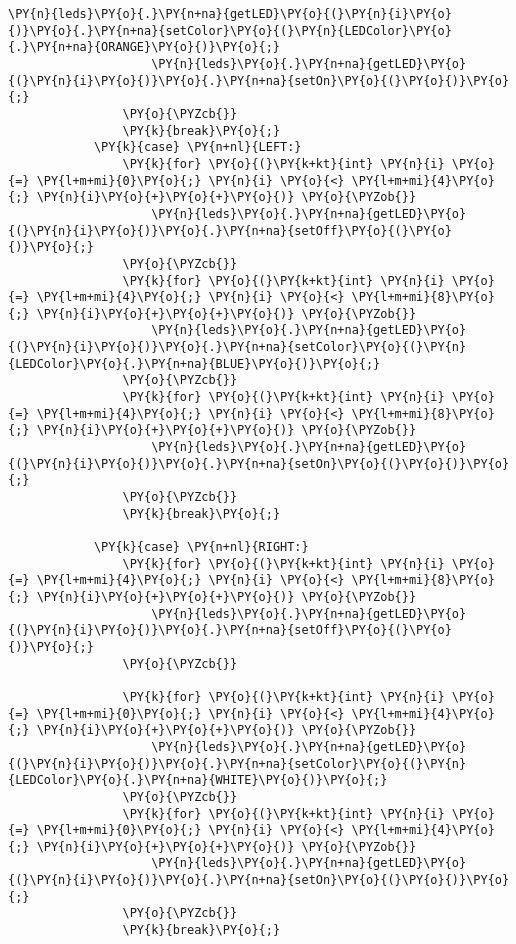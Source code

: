 \begin{Verbatim}[commandchars=\\\{\}]
                    \PY{n}{leds}\PY{o}{.}\PY{n+na}{getLED}\PY{o}{(}\PY{n}{i}\PY{o}{)}\PY{o}{.}\PY{n+na}{setColor}\PY{o}{(}\PY{n}{LEDColor}\PY{o}{.}\PY{n+na}{ORANGE}\PY{o}{)}\PY{o}{;}
                    \PY{n}{leds}\PY{o}{.}\PY{n+na}{getLED}\PY{o}{(}\PY{n}{i}\PY{o}{)}\PY{o}{.}\PY{n+na}{setOn}\PY{o}{(}\PY{o}{)}\PY{o}{;}
                \PY{o}{\PYZcb{}}
                \PY{k}{break}\PY{o}{;}
            \PY{k}{case} \PY{n+nl}{LEFT:}
                \PY{k}{for} \PY{o}{(}\PY{k+kt}{int} \PY{n}{i} \PY{o}{=} \PY{l+m+mi}{0}\PY{o}{;} \PY{n}{i} \PY{o}{<} \PY{l+m+mi}{4}\PY{o}{;} \PY{n}{i}\PY{o}{+}\PY{o}{+}\PY{o}{)} \PY{o}{\PYZob{}}
                    \PY{n}{leds}\PY{o}{.}\PY{n+na}{getLED}\PY{o}{(}\PY{n}{i}\PY{o}{)}\PY{o}{.}\PY{n+na}{setOff}\PY{o}{(}\PY{o}{)}\PY{o}{;}
                \PY{o}{\PYZcb{}}
                \PY{k}{for} \PY{o}{(}\PY{k+kt}{int} \PY{n}{i} \PY{o}{=} \PY{l+m+mi}{4}\PY{o}{;} \PY{n}{i} \PY{o}{<} \PY{l+m+mi}{8}\PY{o}{;} \PY{n}{i}\PY{o}{+}\PY{o}{+}\PY{o}{)} \PY{o}{\PYZob{}}
                    \PY{n}{leds}\PY{o}{.}\PY{n+na}{getLED}\PY{o}{(}\PY{n}{i}\PY{o}{)}\PY{o}{.}\PY{n+na}{setColor}\PY{o}{(}\PY{n}{LEDColor}\PY{o}{.}\PY{n+na}{BLUE}\PY{o}{)}\PY{o}{;}
                \PY{o}{\PYZcb{}}
                \PY{k}{for} \PY{o}{(}\PY{k+kt}{int} \PY{n}{i} \PY{o}{=} \PY{l+m+mi}{4}\PY{o}{;} \PY{n}{i} \PY{o}{<} \PY{l+m+mi}{8}\PY{o}{;} \PY{n}{i}\PY{o}{+}\PY{o}{+}\PY{o}{)} \PY{o}{\PYZob{}}
                    \PY{n}{leds}\PY{o}{.}\PY{n+na}{getLED}\PY{o}{(}\PY{n}{i}\PY{o}{)}\PY{o}{.}\PY{n+na}{setOn}\PY{o}{(}\PY{o}{)}\PY{o}{;}
                \PY{o}{\PYZcb{}}
                \PY{k}{break}\PY{o}{;}

            \PY{k}{case} \PY{n+nl}{RIGHT:}
                \PY{k}{for} \PY{o}{(}\PY{k+kt}{int} \PY{n}{i} \PY{o}{=} \PY{l+m+mi}{4}\PY{o}{;} \PY{n}{i} \PY{o}{<} \PY{l+m+mi}{8}\PY{o}{;} \PY{n}{i}\PY{o}{+}\PY{o}{+}\PY{o}{)} \PY{o}{\PYZob{}}
                    \PY{n}{leds}\PY{o}{.}\PY{n+na}{getLED}\PY{o}{(}\PY{n}{i}\PY{o}{)}\PY{o}{.}\PY{n+na}{setOff}\PY{o}{(}\PY{o}{)}\PY{o}{;}
                \PY{o}{\PYZcb{}}

                \PY{k}{for} \PY{o}{(}\PY{k+kt}{int} \PY{n}{i} \PY{o}{=} \PY{l+m+mi}{0}\PY{o}{;} \PY{n}{i} \PY{o}{<} \PY{l+m+mi}{4}\PY{o}{;} \PY{n}{i}\PY{o}{+}\PY{o}{+}\PY{o}{)} \PY{o}{\PYZob{}}
                    \PY{n}{leds}\PY{o}{.}\PY{n+na}{getLED}\PY{o}{(}\PY{n}{i}\PY{o}{)}\PY{o}{.}\PY{n+na}{setColor}\PY{o}{(}\PY{n}{LEDColor}\PY{o}{.}\PY{n+na}{WHITE}\PY{o}{)}\PY{o}{;}
                \PY{o}{\PYZcb{}}
                \PY{k}{for} \PY{o}{(}\PY{k+kt}{int} \PY{n}{i} \PY{o}{=} \PY{l+m+mi}{0}\PY{o}{;} \PY{n}{i} \PY{o}{<} \PY{l+m+mi}{4}\PY{o}{;} \PY{n}{i}\PY{o}{+}\PY{o}{+}\PY{o}{)} \PY{o}{\PYZob{}}
                    \PY{n}{leds}\PY{o}{.}\PY{n+na}{getLED}\PY{o}{(}\PY{n}{i}\PY{o}{)}\PY{o}{.}\PY{n+na}{setOn}\PY{o}{(}\PY{o}{)}\PY{o}{;}
                \PY{o}{\PYZcb{}}
                \PY{k}{break}\PY{o}{;}


\end{Verbatim}
